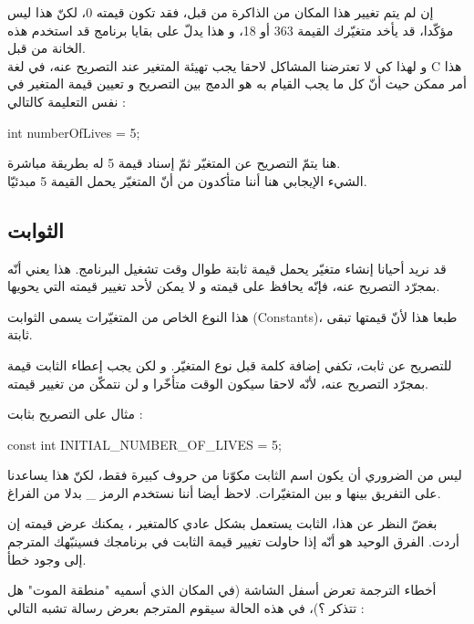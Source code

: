 إن لم يتم تغيير هذا المكان من الذاكرة من قبل، فقد تكون قيمته 0، لكنّ هذا ليس مؤكّدا، قد يأخد متغيّرك القيمة 363 أو 18، و هذا يدلّ على بقايا برنامج قد استخدم هذه الخانة من قبل.\\
و لهذا كي لا تعترضنا المشاكل لاحقا يجب تهيئة المتغير عند التصريح عنه، في لغة
\textenglish{C}
هذا أمر ممكن حيث أنّ كل ما يجب القيام به هو الدمج بين التصريح و تعيين قيمة المتغير في نفس التعليمة كالتالي :

\begin{Csource}
int numberOfLives = 5;
\end{Csource}

هنا يتمّ  التصريح عن المتغيّر ثمّ إسناد قيمة 5 له بطريقة مباشرة.\\
الشيء الإيجابي هنا أننا متأكدون من أنّ المتغيّر يحمل القيمة 5 مبدئيّا.

\subsection{الثوابت}

قد نريد أحيانا إنشاء متغيّر يحمل قيمة ثابتة طوال وقت تشغيل البرنامج. هذا يعني أنّه بمجرّد التصريح عنه، فإنّه يحافظ على قيمته و لا يمكن لأحد تغيير قيمته التي يحويها.

هذا النوع الخاص من المتغيّرات يسمى الثوابت (\textenglish{Constants})، طبعا هذا لأنّ قيمتها تبقى ثابتة.

للتصريح عن ثابت، تكفي إضافة كلمة
قبل نوع المتغيّر. و لكن يجب إعطاء الثابت قيمة بمجرّد التصريح عنه، لأنّه لاحقا سيكون الوقت متأخّرا و لن نتمكّن من تغيير قيمته.

مثال على التصريح بثابت :

\begin{Csource}
const int INITIAL_NUMBER_OF_LIVES = 5;
\end{Csource}

\begin{information}
  ليس من الضروري أن يكون اسم الثابت مكوّنا من حروف كبيرة فقط، لكنّ هذا يساعدنا على التفريق بينها و بين المتغيّرات. لاحظ أيضا أننا نستخدم الرمز
\_
 بدلا من الفراغ.
\end{information}

بغضّ النظر عن هذا، الثابت يستعمل بشكل عادي كالمتغير ، يمكنك عرض قيمته إن أردت. الفرق الوحيد هو أنّه إذا حاولت تغيير قيمة الثابت في برنامجك فسينبّهك المترجم إلى وجود خطأ.

أخطاء الترجمة تعرض أسفل الشاشة (في المكان الذي أسميه "منطقة الموت" هل تتذكر ؟)، في هذه الحالة سيقوم المترجم بعرض رسالة تشبه التالي :\\

